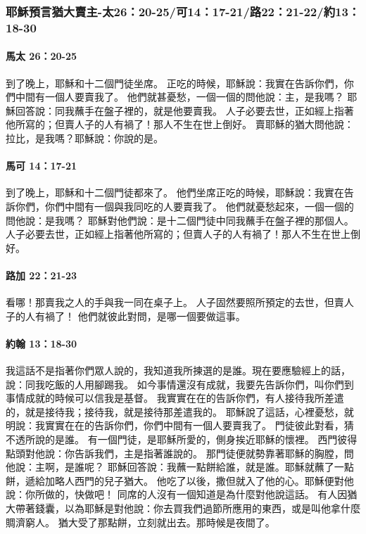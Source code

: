 \subsubsection{耶穌預言猶大賣主-太26：20-25/可14：17-21/路22：21-22/約13：18-30}
\paragraph{馬太 26：20-25}
到了晚上，耶穌和十二個門徒坐席。
正吃的時候，耶穌說：我實在告訴你們，你們中間有一個人要賣我了。
他們就甚憂愁，一個一個的問他說：主，是我嗎？
耶穌回答說：同我蘸手在盤子裡的，就是他要賣我。
人子必要去世，正如經上指著他所寫的；但賣人子的人有禍了！那人不生在世上倒好。
賣耶穌的猶大問他說：拉比，是我嗎？耶穌說：你說的是。
\paragraph{馬可 14：17-21}
到了晚上，耶穌和十二個門徒都來了。
他們坐席正吃的時候，耶穌說：我實在告訴你們，你們中間有一個與我同吃的人要賣我了。
他們就憂愁起來，一個一個的問他說：是我嗎？
耶穌對他們說：是十二個門徒中同我蘸手在盤子裡的那個人。
人子必要去世，正如經上指著他所寫的；但賣人子的人有禍了！那人不生在世上倒好。
\paragraph{路加 22：21-23}
看哪！那賣我之人的手與我一同在桌子上。
人子固然要照所預定的去世，但賣人子的人有禍了！
他們就彼此對問，是哪一個要做這事。
\paragraph{約翰 13：18-30}
我這話不是指著你們眾人說的，我知道我所揀選的是誰。現在要應驗經上的話，說：同我吃飯的人用腳踢我。
如今事情還沒有成就，我要先告訴你們，叫你們到事情成就的時候可以信我是基督。
我實實在在的告訴你們，有人接待我所差遣的，就是接待我；接待我，就是接待那差遣我的。
耶穌說了這話，心裡憂愁，就明說：我實實在在的告訴你們，你們中間有一個人要賣我了。
門徒彼此對看，猜不透所說的是誰。
有一個門徒，是耶穌所愛的，側身挨近耶穌的懷裡。
西門彼得點頭對他說：你告訴我們，主是指著誰說的。
那門徒便就勢靠著耶穌的胸膛，問他說：主啊，是誰呢？
耶穌回答說：我蘸一點餅給誰，就是誰。耶穌就蘸了一點餅，遞給加略人西門的兒子猶大。
他吃了以後，撒但就入了他的心。耶穌便對他說：你所做的，快做吧！
同席的人沒有一個知道是為什麼對他說這話。
有人因猶大帶著錢囊，以為耶穌是對他說：你去買我們過節所應用的東西，或是叫他拿什麼賙濟窮人。
猶大受了那點餅，立刻就出去。那時候是夜間了。
